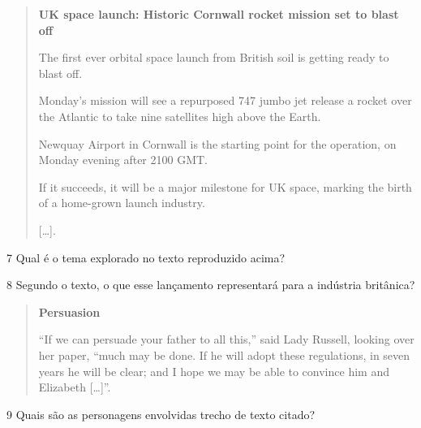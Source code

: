 \begin{quote}
\textbf{UK space launch: Historic Cornwall rocket mission set to blast off}

The first ever orbital space launch from British soil is getting ready
to blast off.

Monday's mission will see a repurposed 747 jumbo jet release a rocket
over the Atlantic to take nine satellites high above the Earth.

Newquay Airport in Cornwall is the starting point for the operation, on
Monday evening after 2100 GMT.

If it succeeds, it will be a major milestone for UK space, marking the
birth of a home-grown launch industry.

{[}\ldots{}{]}.

\end{quote}

\num{7} Qual é o tema explorado no texto reproduzido acima?



\num{8} Segundo o texto, o que esse lançamento representará para a indústria britânica?




\begin{quote}
\textbf{Persuasion}

``If we can persuade your father to all this,'' said Lady Russell,
looking over her paper, ``much may be done. If he will adopt these
regulations, in seven years he will be clear; and I hope we may be able
to convince him and Elizabeth {[}\ldots{}{]}''.

\end{quote}

\num{9} Quais são as personagens envolvidas trecho de texto citado?

